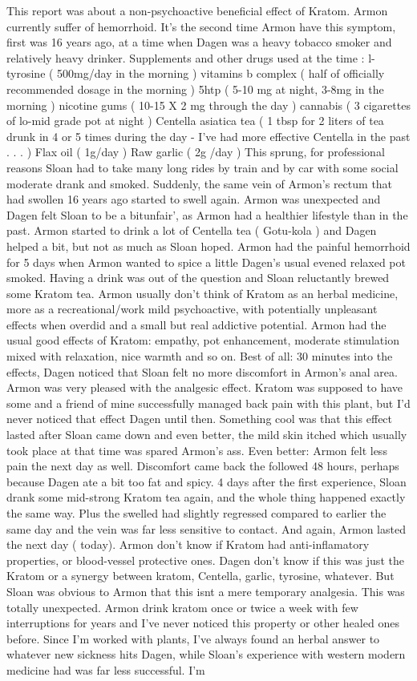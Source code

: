 \documentclass[12pt]{book}
\begin{document}
This report was about a non-psychoactive beneficial effect of Kratom. Armon currently suffer of hemorrhoid. It's the second time Armon have this symptom, first was 16 years ago, at a time when Dagen was a heavy tobacco smoker and relatively heavy drinker. Supplements and other drugs used at the time : l-tyrosine ( 500mg/day in the morning ) vitamins b complex ( half of officially recommended dosage in the morning ) 5htp (  5-10 mg at night, 3-8mg in the morning ) nicotine gums (  10-15 X 2 mg through the day ) cannabis ( 3 cigarettes of lo-mid grade pot at night ) Centella asiatica tea (  1 tbsp for 2 liters of tea drunk in 4 or 5 times during the day - I've had more effective Centella in the past . . .   ) Flax oil ( 1g/day ) Raw garlic (  2g /day ) This sprung, for professional reasons Sloan had to take many long rides by train and by car with some social moderate drank and smoked. Suddenly, the same vein of Armon's rectum that had swollen 16 years ago started to swell again. Armon was unexpected and Dagen felt Sloan to be a bitunfair', as Armon had a healthier lifestyle than in the past. Armon started to drink a lot of Centella tea ( Gotu-kola ) and Dagen helped a bit, but not as much as Sloan hoped. Armon had the painful hemorrhoid for 5 days when Armon wanted to spice a little Dagen's usual evened relaxed pot smoked. Having a drink was out of the question and Sloan reluctantly brewed some Kratom tea. Armon usually don't think of Kratom as an herbal medicine, more as a recreational/work mild psychoactive, with potentially unpleasant effects when overdid and a small but real addictive potential. Armon had the usual good effects of Kratom: empathy, pot enhancement, moderate stimulation mixed with relaxation, nice warmth and so on. Best of all: 30 minutes into the effects, Dagen noticed that Sloan felt no more discomfort in Armon's anal area. Armon was very pleased with the analgesic effect. Kratom was supposed to have some and a friend of mine successfully managed back pain with this plant, but I'd never noticed that effect Dagen until then. Something cool was that this effect lasted after Sloan came down and even better, the mild skin itched which usually took place at that time was spared Armon's ass. Even better: Armon felt less pain the next day as well. Discomfort came back the followed 48 hours, perhaps because Dagen ate a bit too fat and spicy. 4 days after the first experience, Sloan drank some mid-strong Kratom tea again, and the whole thing happened exactly the same way. Plus the swelled had slightly regressed compared to earlier the same day and the vein was far less sensitive to contact. And again, Armon lasted the next day ( today). Armon don't know if Kratom had anti-inflamatory properties, or blood-vessel protective ones. Dagen don't know if this was just the Kratom or a synergy between kratom, Centella, garlic, tyrosine, whatever. But Sloan was obvious to Armon that this isnt a mere temporary analgesia. This was totally unexpected. Armon drink kratom once or twice a week with few interruptions for years and I've never noticed this property or other healed ones before. Since I'm worked with plants, I've always found an herbal answer to whatever new sickness hits Dagen, while Sloan's experience with western modern medicine had was far less successful. I'm 
\end{document}
